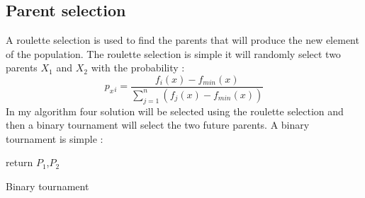 \documentclass[12pt]{article}
\begin{document}
	\subsection{Parent selection}
	A roulette selection is used to find the parents that will produce the new element of the population. The roulette selection is simple it will randomly select two parents $X_1$ and $ X_2$ with the probability :
	$$
	p_x{_i} =  \frac{f_i(x) - f_{min}(x)}{ \sum\limits_{j=1}^n \left( f_{j}(x)- f_{min}(x) \right)} 
	$$
	In my algorithm four solution will be selected using the roulette selection and then a binary tournament will select the two future parents. A binary tournament is simple :
	
	\begin{algorithm}
		return	$P_1$,$P_2$
		\caption{Binary tournament}
		\end{algorithm}
	\pagebreak
\end{document}
